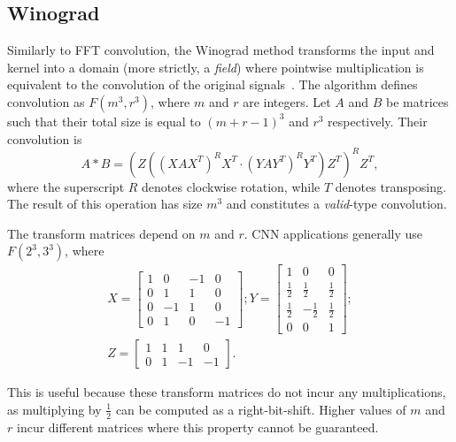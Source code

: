 \documentclass[
  10pt,
  \FORMAT-MODE,
  \REVIEW-MODE,
  \TWOSIDE-MODE
]{IEEEtran}
\begin{document}
  \subsection{Winograd}
    Similarly to FFT convolution, the Winograd method transforms the input and kernel into a domain (more strictly, a \textit{field}) where pointwise multiplication is equivalent to the convolution of the original signals~\cite{lavin2016fast}. The algorithm defines convolution as $F(m^3,r^3)$, where $m$ and $r$ are integers. Let $A$ and $B$ be matrices such that their total size is equal to $(m+r-1)^3$ and $r^3$ respectively. Their convolution is
    \begin{equation*}
      A*B = (Z( (XAX^T)^RX^T \cdot (YAY^T)^RY^T )Z^T)^RZ^T,
    \end{equation*}
    where the superscript $R$ denotes clockwise rotation, while $T$ denotes transposing. The result of this operation has size $m^3$ and constitutes a \textit{valid}-type convolution.

    The transform matrices depend on $m$ and $r$. CNN applications generally use $F(2^3,3^3)$, where
    \begin{equation*}
      \begin{gathered}
        X = 
        \begin{bmatrix}
          1 &  0 & -1 &  0\\
          0 &  1 &  1 &  0\\
          0 & -1 &  1 &  0\\
          0 &  1 &  0 & -1
        \end{bmatrix};
        Y = 
        \begin{bmatrix}
          1 & 0 & 0\\
          \frac{1}{2} & \frac{1}{2} & \frac{1}{2}\\
          \frac{1}{2} & -\frac{1}{2} & \frac{1}{2}\\
          0 & 0 & 1
        \end{bmatrix};\\
        Z = 
        \begin{bmatrix}
          1 &  1 &  1 &  0\\
          0 &  1 & -1 & -1
        \end{bmatrix}.
      \end{gathered}
    \end{equation*}

    This is useful because these transform matrices do not incur any multiplications, as multiplying by $\frac{1}{2}$ can be computed as a right-bit-shift. Higher values of $m$ and $r$ incur different matrices where this property cannot be guaranteed.
\end{document}
